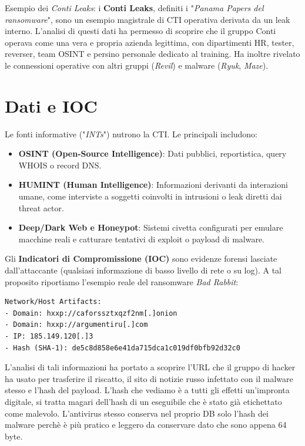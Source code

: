 Esempio dei \textit{Conti Leaks}: i \textbf{Conti Leaks}, definiti i "\textit{Panama Papers del 
ransomware}", sono un esempio magistrale di CTI operativa derivata da un leak interno. 
L'analisi di questi dati ha permesso di scoprire che il gruppo Conti operava come una 
vera e propria azienda legittima, con dipartimenti HR, tester, reverser, team OSINT e 
persino personale dedicato al training. Ha inoltre rivelato le connessioni operative 
con altri gruppi (\textit{Revil}) e malware (\textit{Ryuk}, \textit{Maze}).

\section{Dati e IOC}

Le fonti informative ("\textit{INTs}") nutrono la CTI. Le principali includono:

\begin{itemize}
    \item \textbf{OSINT (Open-Source Intelligence)}: Dati pubblici, reportistica, 
    query WHOIS o record DNS.
    \item \textbf{HUMINT (Human Intelligence)}: Informazioni derivanti da interazioni 
    umane, come interviste a soggetti coinvolti in intrusioni o leak diretti dai 
    threat actor.
    \item \textbf{Deep/Dark Web e Honeypot}: Sistemi civetta configurati per emulare
    macchine reali e catturare tentativi di exploit o payload di malware.
\end{itemize}

Gli \textbf{Indicatori di Compromissione (IOC)} sono evidenze forensi lasciate 
dall'attaccante (qualsiasi informazione di basso livello di rete o su log). A tal 
proposito riportiamo l'esempio reale del ransomware \textit{Bad Rabbit}:

\begin{lstlisting}
Network/Host Artifacts:
- Domain: hxxp://caforssztxqzf2nm[.]onion 
- Domain: hxxp://argumentiru[.]com 
- IP: 185.149.120[.]3 
- Hash (SHA-1): de5c8d858e6e41da715dca1c019df0bfb92d32c0 
\end{lstlisting}

L'analisi di tali informazioni ha portato a scoprire l'URL che il gruppo di hacker ha usato per 
trasferire il riscatto, il sito di notizie russo infettato con il malware stesso e l'hash 
del payload. L'hash che vediamo è a tutti gli effetti un'impronta digitale, si tratta 
magari dell'hash di un eseguibile che è stato già etichettato come malevolo. L'antivirus stesso 
conserva nel proprio DB solo l'hash dei malware perchè è più pratico e leggero da conservare dato 
che sono appena 64 byte.

